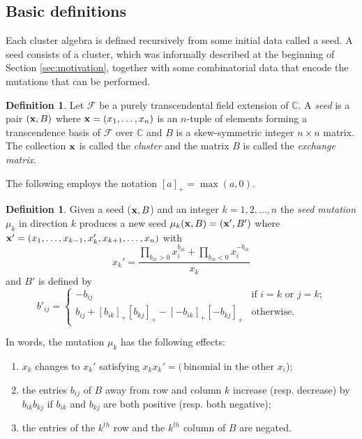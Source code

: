 \documentclass{amsart}
\theoremstyle{definition}
\newtheorem{definition}[theorem]{Definition}
\theoremstyle{remark}
\numberwithin{equation}{section}
\newcommand{\cF}{{\mathcal{F}}}
\newcommand{\x}{{\bf x}}
\newcommand{\CC}{{\mathbb{C}}}
\begin{document}
	\subsection{Basic definitions}
	Each cluster algebra is defined recursively from some initial data called a seed.  A seed consists of a cluster, which was informally described at the beginning of Section \ref{sec:motivation}, together with some combinatorial data that encode the mutations that can be performed.

	\begin{definition}
		Let $\cF$ be a purely transcendental field extension of $\CC$.  A \emph{seed} is a pair $(\x,B)$ where $\x = (x_1,\ldots, x_n)$ is an $n$-tuple of elements forming a transcendence basis of $\cF$ over $\CC$ and $B$ is a skew-symmetric integer $n \times n$ matrix.  The collection $\x$ is called the \emph{cluster} and the matrix $B$ is called the \emph{exchange matrix}.
	\end{definition}
  
	The following employs the notation $[a]_+ = \max(a,0)$.
	\begin{definition}
		Given a seed ($\x,B$) and an integer $k=1,2,\ldots, n$ the \emph{seed mutation} $\mu_k$ in direction $k$ produces a new seed $\mu_k(\x,B) = (\x',B')$ where $\x' = (x_1,\ldots, x_{k-1}, x_k', x_{k+1},\ldots, x_n)$ with 
		\begin{equation} \label{eq:exchange relation}
		x_k' = \frac{\prod_{b_{ik}>0} x_i^{b_{ik}} + \prod_{b_{ik}<0} x_i^{-b_{ik}}}{x_k}
		\end{equation}
		and $B'$ is defined by
		\begin{equation}\label{eq:matrix mutation}
      b'_{ij}=\begin{cases}
                 -b_{ij} & \text{if $i=k$ or $j=k$;}\\
                 b_{ij}+[b_{ik}]_+[b_{kj}]_+-[-b_{ik}]_+[-b_{kj}]_+ & \text{otherwise.}
               \end{cases}
    \end{equation}
	\end{definition}
		
	In words, the mutation $\mu_k$ has the following effects:
	\begin{enumerate}
	\item $x_k$ changes to $x_k'$ satisfying $x_kx_k' = (\,\textrm{binomial in the other } x_i$);
	\item the entries $b_{ij}$ of $B$ away from row and column $k$ increase (resp. decrease) by $b_{ik}b_{kj}$ if $b_{ik}$ and $b_{kj}$ are both positive (resp. both negative);
	\item the entries of the $k^{th}$ row and the $k^{th}$ column of $B$ are negated.
	\end{enumerate}
	
\end{document}
